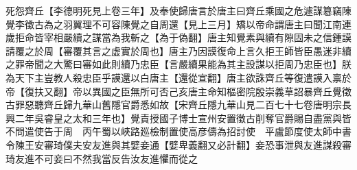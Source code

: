 死怨齊丘【李德明死見上卷三年】及奉使歸唐言於唐主曰齊丘乘國之危遽謀簒竊陳覺李徵古為之羽翼理不可容陳覺之自周還【見上三月】矯以帝命謂唐主曰聞江南連歲拒命皆宰相嚴續之謀當為我斬之【為于偽翻】唐主知覺素與續有隙固未之信鍾謨請覆之於周【審覆其言之虚實於周也】唐主乃因謨復命上言久拒王師皆臣愚迷非續之罪帝聞之大驚曰審如此則續乃忠臣【言嚴續果能為其主設謀以拒周乃忠臣也】朕為天下主豈教人殺忠臣乎謨還以白唐主【還從宣翻】唐主欲誅齊丘等復遣謨入禀於帝【復扶又翻】帝以異國之臣無所可否己亥唐主命知樞密院殷崇義草詔暴齊丘覺徵古罪惡聽齊丘歸九華山舊隱官爵悉如故【宋齊丘隱九華山見二百七十七卷唐明宗長興二年吳睿皇之太和三年也】覺責授國子博士宣州安置徵古削奪官爵賜自盡黨與皆不問遣使告于周　丙午蜀以峽路廵檢制置使高彦儔為招討使　平盧節度使太師中書令陳王安審琦僕夫安友進與其嬖妾通【嬖卑義翻又必計翻】妾恐事泄與友進謀殺審琦友進不可妾曰不然我當反告汝友進懼而從之

